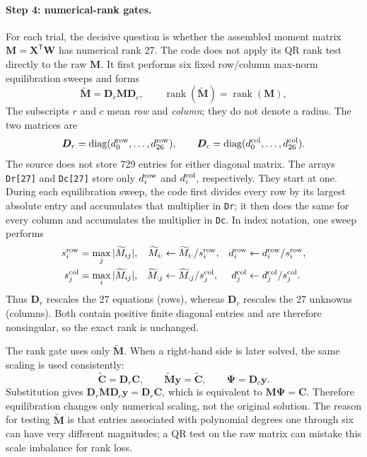\documentclass[11pt,a4paper]{article}
\begin{document}
\paragraph{Step 4: numerical-rank gates.}
For each trial, the decisive question is whether the assembled moment matrix
$\bm M=\bm X^{\mathsf T}\bm W$ has numerical rank 27. The code does not apply its QR
rank test directly to the raw $\bm M$. It first performs six fixed row/column max-norm
equilibration sweeps and forms
\begin{equation}
 \widetilde{\bm M}=\bm D_r\bm M\bm D_c,
 \qquad
 \operatorname{rank}(\widetilde{\bm M})=\operatorname{rank}(\bm M),
\label{eq:project-equilibrated-rank}
\end{equation}
The subscripts $r$ and $c$ mean \emph{row} and \emph{column}; they do not denote a
radius. The two matrices are
\begin{equation}
 \bm D_r=\operatorname{diag}(d^{\rm row}_0,\ldots,d^{\rm row}_{26}),
 \qquad
 \bm D_c=\operatorname{diag}(d^{\rm col}_0,\ldots,d^{\rm col}_{26}).
\label{eq:project-equilibration-diagonals}
\end{equation}
The source does not store 729 entries for either diagonal matrix. The arrays
\texttt{Dr[27]} and \texttt{Dc[27]} store only
$d_i^{\rm row}$ and $d_i^{\rm col}$, respectively. They start at one. During each
equilibration sweep, the code first divides every row by its largest absolute entry and
accumulates that multiplier in \texttt{Dr}; it then does the same for every column and
accumulates the multiplier in \texttt{Dc}. In index notation, one sweep performs
\begin{equation}
\begin{aligned}
 s_i^{\rm row}&=\max_j|\widetilde M_{ij}|,&
 \widetilde M_{i:}&\leftarrow\widetilde M_{i:}/s_i^{\rm row},&
 d_i^{\rm row}&\leftarrow d_i^{\rm row}/s_i^{\rm row},\\
 s_j^{\rm col}&=\max_i|\widetilde M_{ij}|,&
 \widetilde M_{:j}&\leftarrow\widetilde M_{:j}/s_j^{\rm col},&
 d_j^{\rm col}&\leftarrow d_j^{\rm col}/s_j^{\rm col}.
\end{aligned}
\label{eq:project-equilibration-sweep}
\end{equation}
Thus $\bm D_r$ rescales the 27 equations (rows), whereas $\bm D_c$ rescales the 27
unknowns (columns). Both contain positive finite diagonal entries and are therefore
nonsingular, so the exact rank is unchanged.

The rank gate uses only $\widetilde{\bm M}$. When a right-hand side is later solved, the
same scaling is used consistently:
\begin{equation}
 \widetilde{\bm C}=\bm D_r\bm C,
 \qquad
 \widetilde{\bm M}\bm y=\widetilde{\bm C},
 \qquad
 \bm\Psi=\bm D_c\bm y.
\label{eq:project-equilibrated-system}
\end{equation}
Substitution gives
$\bm D_r\bm M\bm D_c\bm y=\bm D_r\bm C$, which is equivalent to
$\bm M\bm\Psi=\bm C$. Therefore equilibration changes only numerical scaling, not the
original solution. The reason for testing $\widetilde{\bm M}$ is that entries associated
with polynomial degrees one through six can have very different magnitudes; a QR test on
the raw matrix can mistake this scale imbalance for rank loss.
\end{document}
